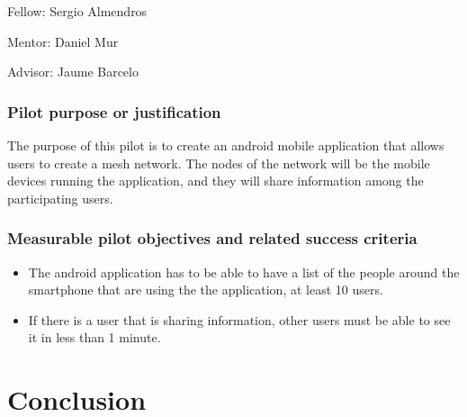 \documentclass[draftclsnofoot,12pt,journal,onecolumn]{IEEEtran}
\begin{document}
Fellow: Sergio Almendros

Mentor: Daniel Mur

Advisor: Jaume Barcelo

\subsubsection{Pilot purpose or justification}
The purpose of this pilot is to create an android mobile application that allows users to create a mesh network.
The nodes of the network will be the mobile devices running the application, and they will share information among the participating users.

\subsubsection{Measurable pilot objectives and related success criteria}
\begin{itemize}
\item The android application has to be able to have a list of the people around the smartphone that are using the the application, at least 10 users.
\item If there is a user that is sharing information, other users must be able to see it in less than 1 minute.
\end{itemize}



\section{Conclusion}
\label{sec:conclusion}






%
\end{document}
